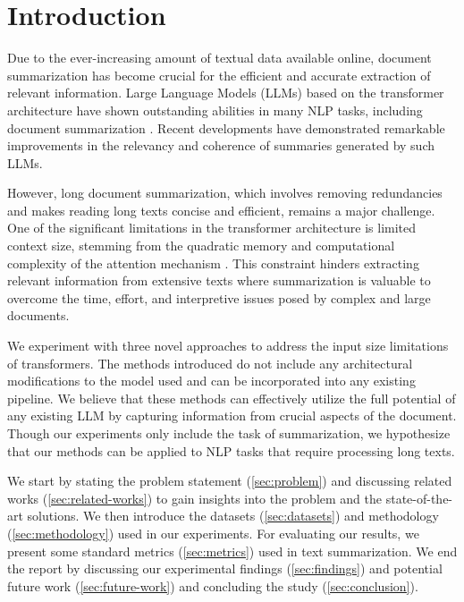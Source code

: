 \section{Introduction}
\label{sec:introduction}

Due to the ever-increasing amount of textual data available online, document summarization has become crucial for the efficient and accurate extraction of relevant information.
Large Language Models (LLMs) based on the transformer architecture \cite{vaswani2017attention} have shown outstanding abilities in many NLP tasks, including document summarization \cite{yadav2023state}.
Recent developments have demonstrated remarkable improvements in the relevancy and coherence of summaries generated by such LLMs.

However, long document summarization, which involves removing redundancies and makes reading long texts concise and efficient, remains a major challenge.
One of the significant limitations in the transformer architecture is limited context size, stemming from the quadratic memory and computational complexity of the attention mechanism \cite{du2023improving}.
This constraint hinders extracting relevant information from extensive texts where summarization is valuable to overcome the time, effort, and interpretive issues posed by complex and large documents.

We experiment with three novel approaches to address the input size limitations of transformers.
The methods introduced do not include any architectural modifications to the model used and can be incorporated into any existing pipeline.
We believe that these methods can effectively utilize the full potential of any existing LLM by capturing information from crucial aspects of the document.
Though our experiments only include the task of summarization, we hypothesize that our methods can be applied to NLP tasks that require processing long texts.

We start by stating the problem statement (\autoref{sec:problem}) and discussing related works (\autoref{sec:related-works}) to gain insights into the problem and the state-of-the-art solutions.
We then introduce the datasets (\autoref{sec:datasets}) and methodology (\autoref{sec:methodology}) used in our experiments.
For evaluating our results, we present some standard metrics (\autoref{sec:metrics}) used in text summarization.
We end the report by discussing our experimental findings (\autoref{sec:findings}) and potential future work (\autoref{sec:future-work}) and concluding the study (\autoref{sec:conclusion}).
